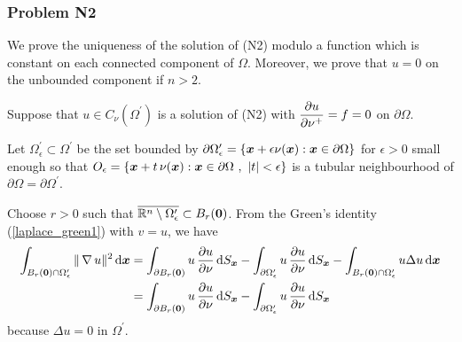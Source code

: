 \subsubsection{Problem N2}
We prove the uniqueness of the solution of (N2) modulo a
function which is constant on each connected component of $\Omega$.
Moreover, we prove that $u=0$ on the unbounded component if $n>2$.

Suppose that $\displaystyle u \in C_{\nu}(\Omega^{\prime})$ is a
solution of (N2) with $\displaystyle \frac{\partial{u}}{\partial \nu^+} = f = 0$ on
$\partial \Omega$.

Let $\displaystyle \Omega^{\prime}_\epsilon \subset \Omega^{\prime}$
be the set bounded by $\partial \Omega^{\prime}_\epsilon
= \{ {\bm{x}} + \epsilon \nu({\bm{x}}) : {\bm{x}}
\in \partial \Omega \}$ for $\epsilon>0$ small enough
so that
$\displaystyle
O_{\epsilon} = \left\{ {\bm{x}} + t\, \nu({\bm{x}}) : {\bm{x}} \in
  \partial \Omega \ , \ |t|<\epsilon \right\}$ is a tubular
neighbourhood of $\displaystyle \partial \Omega = \partial \Omega^{\prime}$.

Choose $r>0$ such that
$\displaystyle \overline{\mathbb{R}^n \setminus \Omega^{\prime}_\epsilon}
\subset B_r({\bm{0}})$.
From the Green's identity (\ref{laplace_green1}) with $v=u$, we have
\begin{align}
\int_{B_r({\bm{0}})\cap\Omega^{\prime}_\epsilon} \| \operatorname{\nabla} u \|^2 \,\mathrm{d}{{\bm{x}}} &=
\int_{\partial B_r({\bm{0}})} u\,\frac{\partial{u}}{\partial \nu} \,\mathrm{d}{S}_{{\bm{x}}}
- \int_{\partial \Omega^{\prime}_\epsilon} u\,\frac{\partial{u}}{\partial \nu} \,\mathrm{d}{S}_{{\bm{x}}}
- \int_{B_r({\bm{0}})\cap\Omega^{\prime}_\epsilon} u \Delta u \,\mathrm{d}{{\bm{x}}}
\nonumber \\
&= \int_{\partial B_r({\bm{0}})} u\,\frac{\partial{u}}{\partial \nu} \,\mathrm{d}{S}_{{\bm{x}}}
- \int_{\partial \Omega^{\prime}_\epsilon} u\,\frac{\partial{u}}{\partial \nu} \,\mathrm{d}{S}_{{\bm{x}}}
\label{potN2Eq1}
\end{align}
because $\Delta u =0$ in $\displaystyle \Omega^{\prime}$.

